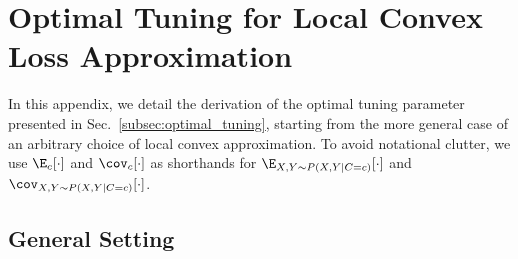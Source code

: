 \documentclass[journal]{IEEEtran}
\begin{document}





\clearpage

\appendices

\section{Optimal Tuning for Local Convex Loss Approximation} \label{apx:optimal_tuning}

In this appendix, we detail the derivation of the optimal tuning parameter presented in Sec.~\ref{subsec:optimal_tuning}, starting from the more general case of an arbitrary choice of local convex approximation.
To avoid notational clutter, we use $\E_c[\cdot]$ and $\cov_c[\cdot]$ as shorthands for $\E_{X, Y \sim P(X,Y|C=c)}[\cdot]$ and $\cov_{X, Y \sim P(X,Y|C=c)}[\cdot]$.

\subsection{General Setting}
\end{document}

